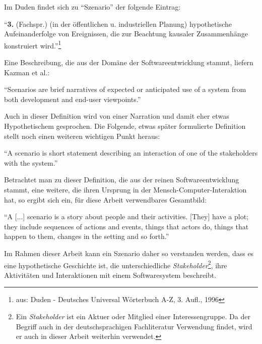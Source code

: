   Im Duden findet sich zu "`Szenario"' der folgende Eintrag:
  
  \begin{definition}\label{def:szenario_allg}
    "`\textbf{3.} (Fachspr.) (in der öffentlichen u. industriellen Planung) hypothetische Aufeinanderfolge von Ereignissen, die zur Beachtung kausaler Zusammenhänge konstruiert wird."'\footnote{aus: Duden - Deutsches Universal Wörterbuch A-Z, 3. Aufl., 1996}
  \end{definition}
  
  Eine Beschreibung, die aus der Domäne der Softwareentwicklung stammt, liefern Kazman et al.:
  
  \begin{definition}\label{def:szenario_kazman_et_al}
    "`Scenarios are brief narratives of expected or anticipated use of a system from both development and end-user viewpoints."'~\emph{\citep[S. 2]{scenario_based_analysis_of_software_architecture}}
  \end{definition}
  
  Auch in dieser Definition wird von einer Narration und damit eher etwas Hypothetischem gesprochen. Die Folgende, etwas später formulierte Definition stellt noch einen weiteren wichtigen Punkt heraus:
  
  \begin{definition}\label{def:szenario_clements_et_al}
    "`A scenario is short statement describing an interaction of one of the stakeholders with the system."'~\emph{\citep[S. 33]{evaluating_software_architectures}}
  \end{definition}
  
  Betrachtet man zu dieser Definition, die aus der reinen Softwareentwicklung stammt, eine weitere, die ihren Ursprung in der Mensch-Computer-Interaktion hat, so ergibt sich ein, für diese Arbeit verwendbares Gesamtbild:
  
  \begin{definition}\label{def:szenario_carroll_rosson}
    "`A [...] scenario is a story about people and their activities. [They] have a plot; they include sequences of actions and events, things that actors do, things that happen to them, changes in the setting and so forth."'~\emph{\citep[S. 16/18]{scenario_based_development}}
  \end{definition}
  
  Im Rahmen dieser Arbeit kann ein Szenario daher so verstanden werden, dass es eine hypothetische Geschichte ist, die unterschiedliche \emph{Stakeholder}\footnote{Ein \emph{Stakeholder} ist ein Aktuer oder Mitglied einer Interessengruppe. Da der Begriff auch in der deutschsprachigen Fachliteratur Verwendung findet, wird er auch in dieser Arbeit weiterhin verwendet.}, ihre Aktivitäten und Interaktionen mit einem Softwaresystem beschreibt.
  
